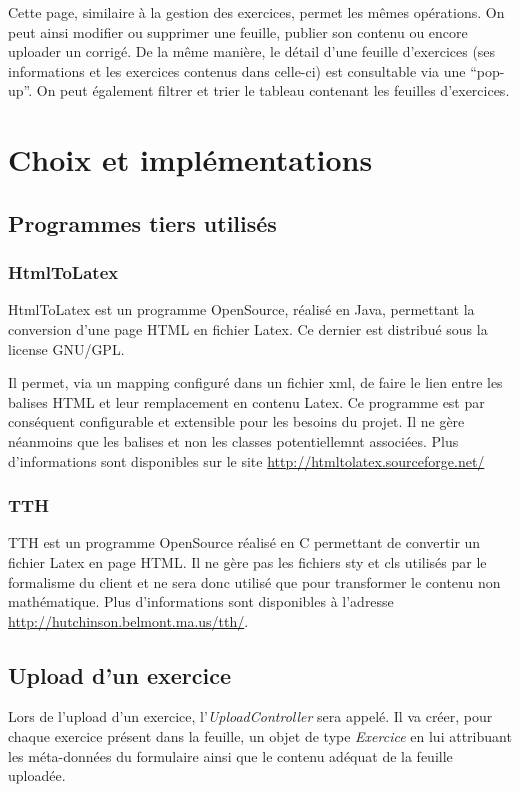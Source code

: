 Cette page, similaire à la gestion des exercices, permet les mêmes opérations. On peut ainsi modifier ou supprimer une feuille, publier son contenu ou encore uploader un corrigé. De la même manière, le détail d'une feuille d'exercices (ses informations et les exercices contenus dans celle-ci) est consultable via une \enquote{pop-up}. On peut également filtrer et trier le tableau contenant les feuilles d'exercices.

\newpage
\section{Choix et implémentations}

\subsection{Programmes tiers utilisés}
\subsubsection{HtmlToLatex}
HtmlToLatex est un programme OpenSource, réalisé en Java, permettant la conversion d'une page HTML en fichier Latex. Ce dernier est distribué sous la license GNU/GPL.

Il permet, via un mapping configuré dans un fichier xml, de faire le lien entre les balises HTML et leur remplacement en contenu Latex. Ce programme est par conséquent configurable et extensible pour les besoins du projet. Il ne gère néanmoins que les balises et non les classes potentiellemnt associées. Plus d'informations sont disponibles sur le site \url{http://htmltolatex.sourceforge.net/}

\subsubsection{TTH}
TTH est un programme OpenSource réalisé en C permettant de convertir un fichier Latex en page HTML. Il ne gère pas les fichiers sty et cls utilisés par le formalisme du client et ne sera donc utilisé que pour transformer le contenu non mathématique.
Plus d'informations sont disponibles à l'adresse \url{http://hutchinson.belmont.ma.us/tth/}.


\subsection{Upload d'un exercice}
Lors de l'upload d'un exercice, l'\textit{UploadController} sera appelé. Il va créer, pour chaque exercice présent dans la feuille, un objet de type \textit{Exercice} en lui attribuant les méta-données du formulaire ainsi que le contenu adéquat de la feuille uploadée.

